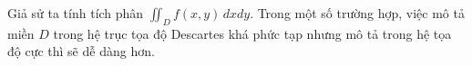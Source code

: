 \documentclass[preview]{standalone}
\begin{document}
\begin{center}
Giả sử ta tính tích phân $\iint_D f(x, y)\,dxdy$. Trong một số trường hợp, việc mô tả miền $D$ trong hệ trục tọa độ Descartes khá phức tạp nhưng mô tả trong  hệ tọa độ cực thì sẽ dễ dàng hơn.
\end{center}
\end{document}

